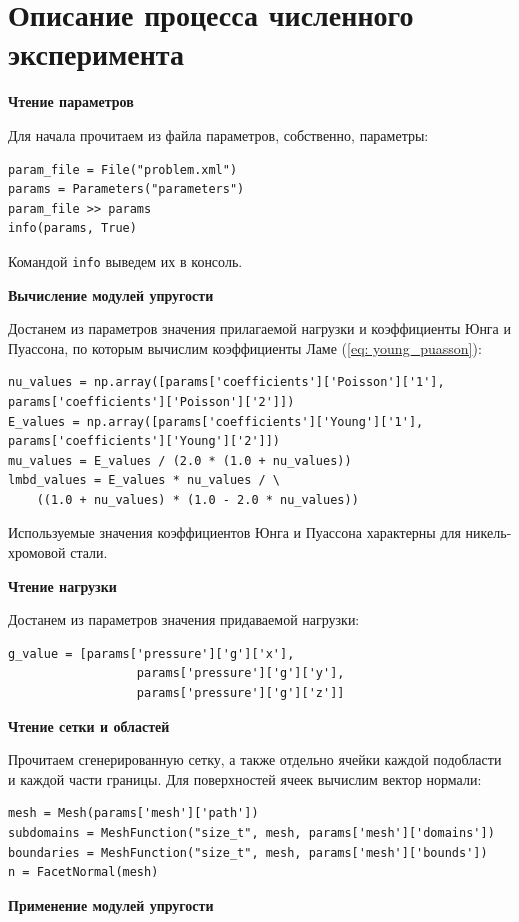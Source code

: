 \documentclass[a4paper, 14pt]{extreport}
\begin{document}
\section{Описание процесса численного эксперимента}

\textbf{Чтение параметров}

Для начала прочитаем из файла параметров, собственно, параметры:
\begin{lstlisting}
param_file = File("problem.xml")
params = Parameters("parameters")
param_file >> params
info(params, True)
\end{lstlisting}

Командой \texttt{info} выведем их в консоль. 

\textbf{Вычисление модулей упругости}

Достанем из параметров значения прилагаемой нагрузки и
коэффициенты Юнга и Пуассона, по которым вычислим коэффициенты Ламе (\ref{eq: young_puasson}):
\begin{lstlisting}
nu_values = np.array([params['coefficients']['Poisson']['1'],
params['coefficients']['Poisson']['2']])
E_values = np.array([params['coefficients']['Young']['1'],
params['coefficients']['Young']['2']])
mu_values = E_values / (2.0 * (1.0 + nu_values))
lmbd_values = E_values * nu_values / \
    ((1.0 + nu_values) * (1.0 - 2.0 * nu_values))
\end{lstlisting}
Используемые значения коэффициентов Юнга и Пуассона характерны для никель-хромовой стали.

\textbf{Чтение нагрузки}

Достанем из параметров значения придаваемой нагрузки:
\begin{lstlisting}
g_value = [params['pressure']['g']['x'],
           		  params['pressure']['g']['y'],
           	 	  params['pressure']['g']['z']]
\end{lstlisting}

\textbf{Чтение сетки и областей}

Прочитаем сгенерированную сетку, а также отдельно ячейки каждой подобласти и каждой части границы. Для поверхностей ячеек вычислим вектор нормали:
\begin{lstlisting}
mesh = Mesh(params['mesh']['path'])
subdomains = MeshFunction("size_t", mesh, params['mesh']['domains'])
boundaries = MeshFunction("size_t", mesh, params['mesh']['bounds'])
n = FacetNormal(mesh)
\end{lstlisting}

\textbf{Применение модулей упругости}
\end{document}
